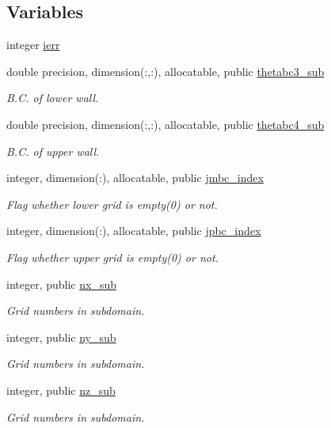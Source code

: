 \subsection*{Variables}
\begin{DoxyCompactItemize}
\item 
integer \mbox{\hyperlink{namespacempi__subdomain_acd16f258caed20a7d8d38cd28ae64688}{ierr}}
\item 
double precision, dimension(\+:,\+:), allocatable, public \mbox{\hyperlink{namespacempi__subdomain_ad61f27caf5f32301a077e21363c2d73b}{thetabc3\+\_\+sub}}
\begin{DoxyCompactList}\small\item\em B.\+C. of lower wall. \end{DoxyCompactList}\item 
double precision, dimension(\+:,\+:), allocatable, public \mbox{\hyperlink{namespacempi__subdomain_ad1705bede0c0d39ad16f9f94afe32be6}{thetabc4\+\_\+sub}}
\begin{DoxyCompactList}\small\item\em B.\+C. of upper wall. \end{DoxyCompactList}\item 
integer, dimension(\+:), allocatable, public \mbox{\hyperlink{namespacempi__subdomain_ac22380b1c941dd6c53cabe7287d185e9}{jmbc\+\_\+index}}
\begin{DoxyCompactList}\small\item\em Flag whether lower grid is empty(0) or not. \end{DoxyCompactList}\item 
integer, dimension(\+:), allocatable, public \mbox{\hyperlink{namespacempi__subdomain_a9adbfdd11c7e9fdb968bb8eef2b13c2b}{jpbc\+\_\+index}}
\begin{DoxyCompactList}\small\item\em Flag whether upper grid is empty(0) or not. \end{DoxyCompactList}\end{DoxyCompactItemize}
\textbf{ }\par
\begin{DoxyCompactItemize}
\item 
integer, public \mbox{\hyperlink{namespacempi__subdomain_a005fe127fe0fc85b932814a820a36444}{nx\+\_\+sub}}
\begin{DoxyCompactList}\small\item\em Grid numbers in subdomain. \end{DoxyCompactList}\item 
integer, public \mbox{\hyperlink{namespacempi__subdomain_a665ba05d0ae9309dd28b9b513a0c87a1}{ny\+\_\+sub}}
\begin{DoxyCompactList}\small\item\em Grid numbers in subdomain. \end{DoxyCompactList}\item 
integer, public \mbox{\hyperlink{namespacempi__subdomain_a07555cc931ac78376a4c81207662251f}{nz\+\_\+sub}}
\begin{DoxyCompactList}\small\item\em Grid numbers in subdomain. \end{DoxyCompactList}\end{DoxyCompactItemize}

